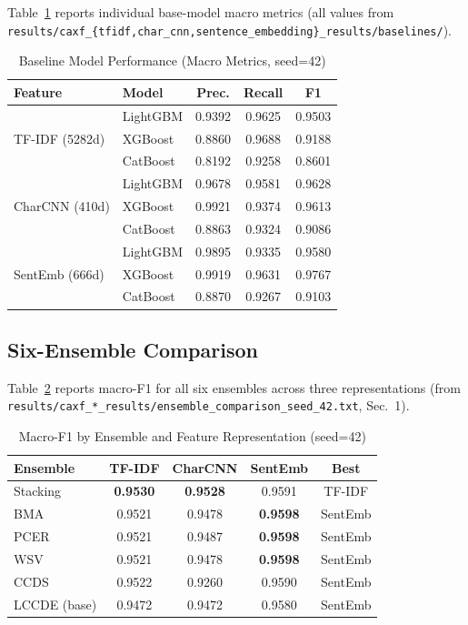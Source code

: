 \documentclass[conference]{IEEEtran}
\begin{document}
Table~\ref{tab:baselines} reports individual base-model macro metrics
(all values from
\texttt{results/caxf\_\{tfidf,char\_cnn,sentence\_embedding\}\_results/baselines/}).

\begin{table}[t]
\centering
\caption{Baseline Model Performance (Macro Metrics, seed=42)}
\label{tab:baselines}
\begin{tabular}{llccc}
\toprule
\textbf{Feature} & \textbf{Model} & \textbf{Prec.} & \textbf{Recall} & \textbf{F1} \\
\midrule
\multirow{3}{*}{TF-IDF (5282d)}
  & LightGBM & 0.9392 & 0.9625 & 0.9503 \\
  & XGBoost  & 0.8860 & 0.9688 & 0.9188 \\
  & CatBoost & 0.8192 & 0.9258 & 0.8601 \\
\midrule
\multirow{3}{*}{CharCNN (410d)}
  & LightGBM & 0.9678 & 0.9581 & 0.9628 \\
  & XGBoost  & 0.9921 & 0.9374 & 0.9613 \\
  & CatBoost & 0.8863 & 0.9324 & 0.9086 \\
\midrule
\multirow{3}{*}{SentEmb (666d)}
  & LightGBM & 0.9895 & 0.9335 & 0.9580 \\
  & XGBoost  & 0.9919 & 0.9631 & 0.9767 \\
  & CatBoost & 0.8870 & 0.9267 & 0.9103 \\
\bottomrule
\end{tabular}
\end{table}

\subsection{Six-Ensemble Comparison}

Table~\ref{tab:ensembles} reports macro-F1 for all six ensembles across three
representations (from
\texttt{results/caxf\_*\_results/ensemble\_comparison\_seed\_42.txt}, Sec.~1).

\begin{table}[t]
\centering
\caption{Macro-F1 by Ensemble and Feature Representation (seed=42)}
\label{tab:ensembles}
\begin{tabular}{lcccc}
\toprule
\textbf{Ensemble} & \textbf{TF-IDF} & \textbf{CharCNN} & \textbf{SentEmb} & \textbf{Best} \\
\midrule
Stacking      & \textbf{0.9530} & \textbf{0.9528} & 0.9591 & TF-IDF \\
BMA           & 0.9521 & 0.9478 & \textbf{0.9598} & SentEmb \\
PCER          & 0.9521 & 0.9487 & \textbf{0.9598} & SentEmb \\
WSV           & 0.9521 & 0.9478 & \textbf{0.9598} & SentEmb \\
CCDS          & 0.9522 & 0.9260 & 0.9590 & SentEmb \\
LCCDE (base)  & 0.9472 & 0.9472 & 0.9580 & SentEmb \\
\bottomrule
\end{tabular}
\end{table}
\end{document}
